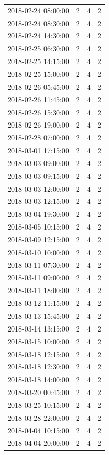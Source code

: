 \begin{tabular}{lrrr}
2018-02-24 08:00:00 & 2 & 4 & 2 \\
2018-02-24 08:30:00 & 2 & 4 & 2 \\
2018-02-24 14:30:00 & 2 & 4 & 2 \\
2018-02-25 06:30:00 & 2 & 4 & 2 \\
2018-02-25 14:15:00 & 2 & 4 & 2 \\
2018-02-25 15:00:00 & 2 & 4 & 2 \\
2018-02-26 05:45:00 & 2 & 4 & 2 \\
2018-02-26 11:45:00 & 2 & 4 & 2 \\
2018-02-26 15:30:00 & 2 & 4 & 2 \\
2018-02-26 19:00:00 & 2 & 4 & 2 \\
2018-02-28 07:00:00 & 2 & 4 & 2 \\
2018-03-01 17:15:00 & 2 & 4 & 2 \\
2018-03-03 09:00:00 & 2 & 4 & 2 \\
2018-03-03 09:15:00 & 2 & 4 & 2 \\
2018-03-03 12:00:00 & 2 & 4 & 2 \\
2018-03-03 12:15:00 & 2 & 4 & 2 \\
2018-03-04 19:30:00 & 2 & 4 & 2 \\
2018-03-05 10:15:00 & 2 & 4 & 2 \\
2018-03-09 12:15:00 & 2 & 4 & 2 \\
2018-03-10 10:00:00 & 2 & 4 & 2 \\
2018-03-11 07:30:00 & 2 & 4 & 2 \\
2018-03-11 09:00:00 & 2 & 4 & 2 \\
2018-03-11 18:00:00 & 2 & 4 & 2 \\
2018-03-12 11:15:00 & 2 & 4 & 2 \\
2018-03-13 15:45:00 & 2 & 4 & 2 \\
2018-03-14 13:15:00 & 2 & 4 & 2 \\
2018-03-15 10:00:00 & 2 & 4 & 2 \\
2018-03-18 12:15:00 & 2 & 4 & 2 \\
2018-03-18 12:30:00 & 2 & 4 & 2 \\
2018-03-18 14:00:00 & 2 & 4 & 2 \\
2018-03-20 00:45:00 & 2 & 4 & 2 \\
2018-03-25 10:15:00 & 2 & 4 & 2 \\
2018-03-28 22:00:00 & 2 & 4 & 2 \\
2018-04-04 10:15:00 & 2 & 4 & 2 \\
2018-04-04 20:00:00 & 2 & 4 & 2 \\

\end{tabular}
